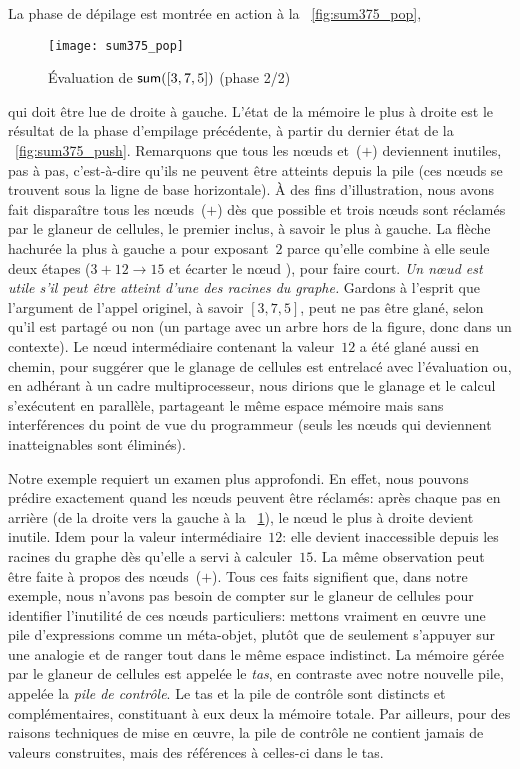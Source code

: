 La phase de dépilage est montrée en action à la \fig~\vref{fig:sum375_pop},
\begin{figure}[b]
\centering
\texttt{[image: sum375\_pop]}
\caption{Évaluation de \(\textsf{sum}([3,7,5])\) (phase 2/2)}
\label{fig:sum375_pop}
\end{figure}
qui doit être lue de droite à gauche. L'état de la mémoire le plus à
droite est le résultat de la phase d'empilage précédente, à partir du
dernier état de la \fig~\ref{fig:sum375_push}. Remarquons que tous les
nœuds  et~(\(+\)) deviennent inutiles, pas à pas,
c'est-à-dire qu'ils ne peuvent être atteints depuis la pile (ces
nœuds se trouvent sous la ligne de base horizontale). À des fins
d'illustration, nous avons fait disparaître tous les nœuds~(\(+\))
dès que possible et trois nœuds  sont réclamés par le
glaneur de cellules, le premier inclus, à savoir le plus à gauche. La
flèche hachurée la plus à gauche a pour exposant~\(2\) parce qu'elle
combine à elle seule deux étapes (\(3+12 \rightarrow 15\) et écarter
le nœud ), pour faire court. \emph{Un nœud est utile
  s'il peut être atteint d'une des racines du graphe.} Gardons à
l'esprit que l'argument de l'appel originel, à savoir \([3,7,5]\),
peut ne pas être glané, selon qu'il est partagé ou non (un partage
avec un arbre hors de la figure, donc dans un contexte). Le nœud
intermédiaire contenant la valeur~\(12\) a été glané aussi en chemin,
pour suggérer que le glanage de cellules est entrelacé avec
l'évaluation ou, en adhérant à un cadre multiprocesseur, nous dirions
que le glanage et le calcul s'exécutent en parallèle, partageant le
même espace mémoire mais sans interférences du point de vue du
programmeur (seuls les nœuds qui deviennent inatteignables sont
éliminés).

Notre exemple requiert un examen plus approfondi. En effet, nous
pouvons prédire exactement quand les nœuds  peuvent être
réclamés: après chaque pas en arrière (de la droite vers la gauche à
la \fig~\ref{fig:sum375_pop}), le nœud  le plus à droite
devient inutile. Idem pour la valeur intermédiaire~\(12\): elle
devient inaccessible depuis les racines du graphe dès qu'elle a servi
à calculer~\(15\). La même observation peut être faite à propos des
nœuds~(\(+\)). Tous ces faits signifient que, dans notre exemple,
nous n'avons pas besoin de compter sur le glaneur de cellules pour
identifier l'inutilité de ces nœuds particuliers: mettons vraiment
en œuvre une pile d'expressions comme un méta-objet, plutôt que de
seulement s'appuyer sur une analogie et de ranger tout dans le même
espace indistinct. La mémoire gérée par le glaneur de cellules est
appelée le \emph{tas}, en contraste avec notre nouvelle pile, appelée
la \emph{pile de contrôle}. Le tas et la pile de contrôle sont
distincts et complémentaires, constituant à eux deux la mémoire
totale. Par ailleurs, pour des raisons techniques de mise en
œuvre, la pile de contrôle ne contient jamais de valeurs
construites, mais des références à celles-ci dans le tas.

